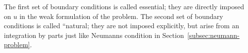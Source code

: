 The first set of boundary conditions is called essential; they are directly imposed on $u$ in the weak formulation of the problem. The second set of boundary conditions is called ``natural\textquotesingle\textquotesingle; they are not imposed explicitly, but arise from an integration by parts just like Neumann\textquotesingle s condition in Section~\ref{subsec:neumann-problem}.
